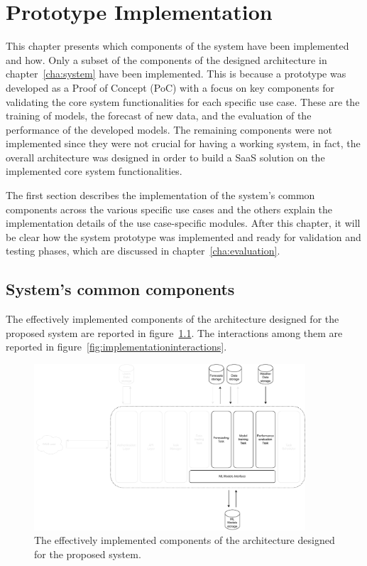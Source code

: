 \chapter{Prototype Implementation}
\label{cha:implementation}
\vspace{0.4 cm}

This chapter presents which components of the system have been implemented and how.
Only a subset of the components of the designed architecture in chapter~\ref{cha:system} have been implemented.
This is because a prototype was developed as a Proof of Concept (PoC) with a focus on key components for validating the core system functionalities for each specific use case.
These are the training of models, the forecast of new data, and the evaluation of the performance of the developed models.
The remaining components were not implemented since they were not crucial for having a working system, in fact, the overall architecture was designed in order to build a SaaS solution on the implemented core system functionalities.

The first section describes the implementation of the system's common components across the various specific use cases and the others explain the implementation details of the use case-specific modules.
After this chapter, it will be clear how the system prototype was implemented and ready for validation and testing phases, which are discussed in chapter~\ref{cha:evaluation}.


\section{System's common components}
\label{sec:componentsimpl}
\vspace{0.2 cm}

The effectively implemented components of the architecture designed for the proposed system are reported in figure~\ref{fig:implementationcomponents}.
The interactions among them are reported in figure~\ref{fig:implementationinteractions}.

\begin{figure}[H]
\centering
\includegraphics[width=0.9\textwidth]{images/implementation_components}
\caption{The effectively implemented components of the architecture designed for the proposed system.}
\label{fig:implementationcomponents}
\end{figure}

